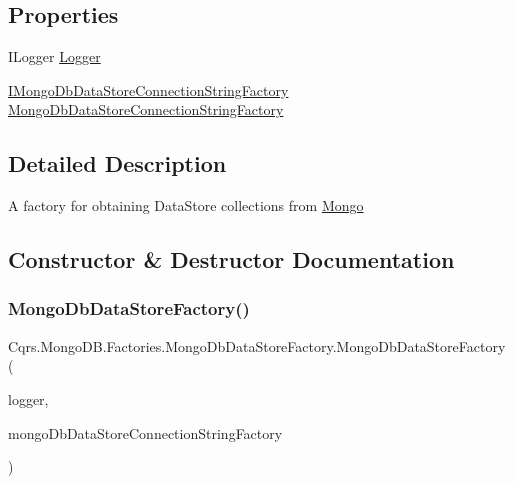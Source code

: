 \subsection*{Properties}
\begin{DoxyCompactItemize}
\item 
I\+Logger \hyperlink{classCqrs_1_1MongoDB_1_1Factories_1_1MongoDbDataStoreFactory_a2756ef3d362bd2c95193e113fa6f9e6d}{Logger}
\item 
\hyperlink{interfaceCqrs_1_1MongoDB_1_1Factories_1_1IMongoDbDataStoreConnectionStringFactory}{I\+Mongo\+Db\+Data\+Store\+Connection\+String\+Factory} \hyperlink{classCqrs_1_1MongoDB_1_1Factories_1_1MongoDbDataStoreFactory_aa19c3db791da60ae4d91a1c667549de7}{Mongo\+Db\+Data\+Store\+Connection\+String\+Factory}
\end{DoxyCompactItemize}


\subsection{Detailed Description}
A factory for obtaining Data\+Store collections from \hyperlink{namespaceCqrs_1_1Mongo}{Mongo} 



\subsection{Constructor \& Destructor Documentation}
\mbox{\label{classCqrs_1_1MongoDB_1_1Factories_1_1MongoDbDataStoreFactory_a5306704647ba6dab35844231ca999b7e}} 
\subsubsection{\texorpdfstring{Mongo\+Db\+Data\+Store\+Factory()}{MongoDbDataStoreFactory()}}
{\footnotesize\ttfamily Cqrs.\+Mongo\+D\+B.\+Factories.\+Mongo\+Db\+Data\+Store\+Factory.\+Mongo\+Db\+Data\+Store\+Factory (\begin{DoxyParamCaption}\item[{I\+Logger}]{logger,  }\item[{\hyperlink{interfaceCqrs_1_1MongoDB_1_1Factories_1_1IMongoDbDataStoreConnectionStringFactory}{I\+Mongo\+Db\+Data\+Store\+Connection\+String\+Factory}}]{mongo\+Db\+Data\+Store\+Connection\+String\+Factory }\end{DoxyParamCaption})}



